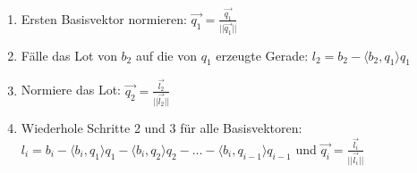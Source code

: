 \begin{enumerate}
    \item Ersten Basisvektor normieren: \(\vec{q_1} = \frac{\vec{q_1}}{||\vec{q_1}||}\)
    \item Fälle das Lot von \(b_2\) auf die von \(q_1\) erzeugte Gerade: \(l_2 = b_2 - \langle b_2, q_1 \rangle q_1\)
    \item Normiere das Lot: \(\vec{q_2} = \frac{\vec{l_2}}{||\vec{l_2}||}\)
    \item Wiederhole Schritte 2 und 3 für alle Basisvektoren:\\ 
            \(l_i = b_i - \langle b_i, q_1 \rangle q_1 - \langle b_i, q_2 \rangle q_2 - \hdots - \langle b_i, q_{i-1} \rangle q_{i-1}\) und \(\vec{q_i} = \frac{\vec{l_i}}{||\vec{l_i}||}\)
\end{enumerate}